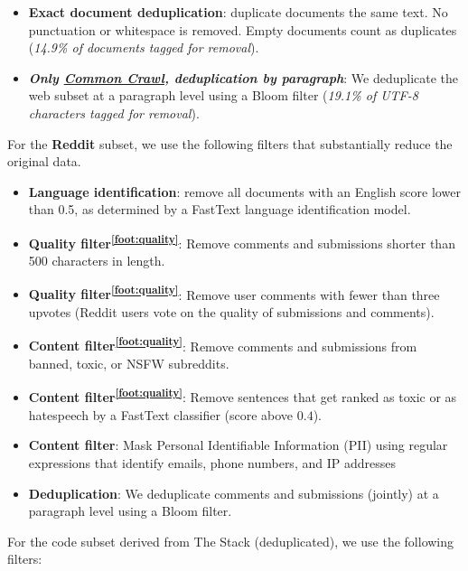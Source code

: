 \documentclass{article}
\newcommand*{\fnref}[1]{\textsuperscript{\ref{#1}}}
\begin{document}
\begin{itemize}[leftmargin=1em]
    and IP addresses; pages containing 6 or more PIIs are completely removed from the corpus (\textit{0.05\% tagged for masking, 0.11\% tagged for removal}); 
    \item \textbf{Exact document deduplication}: duplicate documents the same text. No punctuation or whitespace is removed. Empty documents count as duplicates (\textit{14.9\% of documents tagged for removal}).
    \item \textbf{\textit{Only \underline{Common Crawl}, deduplication by paragraph}}: We deduplicate the web subset at a paragraph level using a Bloom filter (\textit{19.1\% of UTF-8 characters tagged for removal}).
\end{itemize}

For the \textbf{Reddit} subset, we use the following filters that substantially reduce the original data. 

\begin{itemize}[leftmargin=1em]
    \item \textbf{Language identification}: remove all documents with an English score lower than 0.5, as determined by a FastText language identification model.
    \item \textbf{Quality filter\fnref{foot:quality}}: Remove comments and submissions shorter than 500 characters in length.
    \item \textbf{Quality filter\fnref{foot:quality}}: Remove user comments with fewer than three upvotes (Reddit users vote on the quality of submissions and comments).
    \item \textbf{Content filter\fnref{foot:quality}}: Remove comments and submissions from banned,  toxic, or NSFW subreddits.
    \item \textbf{Content filter\fnref{foot:quality}}: Remove sentences that get ranked as toxic or as hatespeech by a FastText classifier (score above $0.4$).
    \item  \textbf{Content filter}: Mask Personal Identifiable Information (PII) using regular expressions that identify emails, phone numbers, 
    and IP addresses
    \item \textbf{Deduplication}: We deduplicate comments and submissions (jointly) at a paragraph level using a Bloom filter.
\end{itemize}

For the code subset derived from The Stack (deduplicated), we use the following filters:
\end{document}
